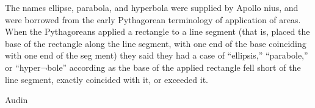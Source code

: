 The names ellipse, parabola, and hyperbola were supplied by Apollo
nius, and were borrowed from the early Pythagorean terminology of
application of areas. When the Pythagoreans applied a rectangle to a
line segment (that is, placed the base of the rectangle along the line
segment, with one end of the base coinciding with one end of the seg
ment) they said they had a case of “ellipsis,” “parabole,” or “hyper¬bole” according as the base of the applied rectangle fell short of the
line segment, exactly coincided with it, or exceeded it.




Audin \cite[s. 183]{audin_2003} %


